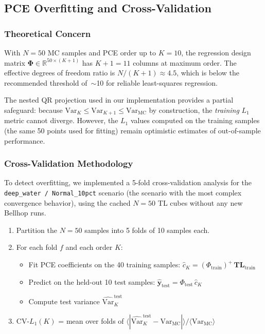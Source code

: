 \documentclass[11pt,a4paper]{article}
\newcommand{\Var}{\mathrm{Var}}
\begin{document}
\subsection{PCE Overfitting and Cross-Validation}
\label{sec:cv}

\subsubsection{Theoretical Concern}

With $N=50$ MC samples and PCE order up to $K=10$, the regression design matrix
$\boldsymbol\Phi \in \mathbb{R}^{50 \times (K+1)}$ has $K+1 = 11$ columns at maximum
order.  The effective degrees of freedom ratio is $N/(K+1) \approx 4.5$, which is
below the recommended threshold of~$\sim$10 for reliable least-squares regression.

The nested QR projection used in our implementation provides a partial safeguard:
because $\Var_K \leq \Var_{K+1} \leq \Var_\text{MC}$ by construction, the \emph{training}
$L_1$ metric cannot diverge.  However, the $L_1$ values computed on the training samples
(the same 50 points used for fitting) remain optimistic estimates of out-of-sample
performance.

\subsubsection{Cross-Validation Methodology}

To detect overfitting, we implemented a 5-fold cross-validation analysis for the
\texttt{deep\_water / Normal\_10pct} scenario (the scenario with the most complex
convergence behavior), using the cached $N=50$ TL cubes without any new Bellhop runs.

\begin{enumerate}
  \item Partition the $N=50$ samples into 5 folds of 10 samples each.
  \item For each fold $f$ and each order $K$:
    \begin{itemize}
      \item Fit PCE coefficients on the 40 training samples: $\hat{c}_K = (\Phi_\text{train})^+\,\mathbf{TL}_\text{train}$
      \item Predict on the held-out 10 test samples: $\hat{\mathbf{y}}_\text{test} = \Phi_\text{test}\,\hat{c}_K$
      \item Compute test variance $\widehat{\Var}_K^\text{test}$
    \end{itemize}
  \item CV-$L_1(K)$ = mean over folds of
        $\langle|\widehat{\Var}_K^\text{test} - \Var_\text{MC}|\rangle / \langle\Var_\text{MC}\rangle$
\end{enumerate}
\end{document}

